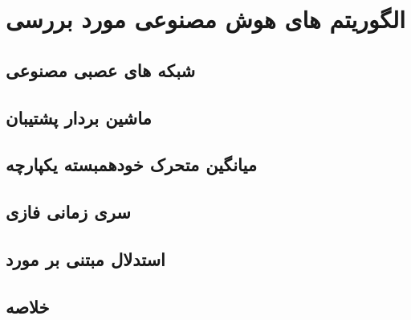 \chapter{الگوریتم های هوش مصنوعی مورد بررسی}
\section{شبکه های عصبی مصنوعی}
\section{ماشین بردار پشتیبان}
\section{میانگین متحرک خودهمبسته یکپارچه}
\section{سری زمانی فازی}
\section{استدلال مبتنی بر مورد}
\section{خلاصه}